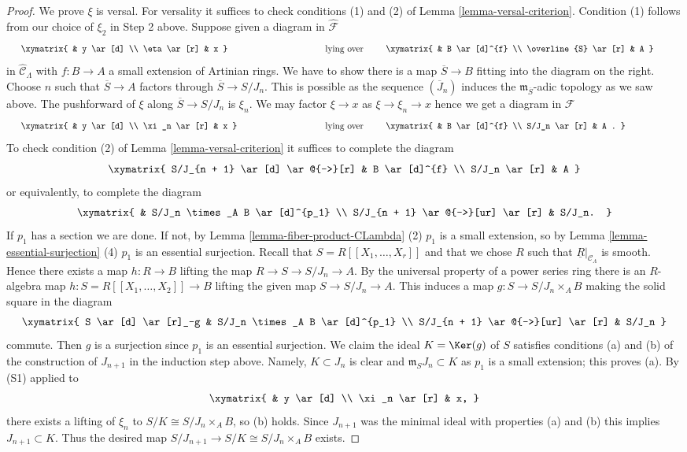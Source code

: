 \begin{proof}
\medskip\noindent
We prove $\xi$ is versal. For versality it suffices to check
conditions (1) and (2) of
Lemma \ref{lemma-versal-criterion}.
Condition (1) follows from our choice of $\xi_2$ in Step 2 above.
Suppose given a diagram in $\widehat{\mathcal{F}}$
$$
\vcenter{
\xymatrix{
            &  y \ar[d] \\
\eta \ar[r]  &  x
}
}
\quad\text{lying over}\quad
\vcenter{
\xymatrix{
         &   B  \ar[d]^{f} \\
\overline{S} \ar[r] &   A
}
}
$$
in $\widehat{\mathcal{C}}_\Lambda$ with $f: B \to A$ a small extension
of Artinian rings. We have to show there is a map $\overline{S} \to B$ fitting
into the diagram on the right. Choose $n$ such that
$\overline{S} \to A$ factors through $\overline{S} \to S/J_n$. This is
possible as the sequence $(\overline{J}_n)$ induces the
$\mathfrak m_{\overline{S}}$-adic topology as we saw above.
The pushforward of $\xi$ along $\overline{S} \to S/J_n$ is $\xi_n$.
We may factor $\xi \to x$ as $\xi \to \xi_n \to x$ hence we get a diagram
in $\mathcal{F}$
$$
\vcenter{
\xymatrix{
            &  y \ar[d] \\
\xi_n \ar[r]  &  x
}
}
\quad\text{lying over}\quad
\vcenter{
\xymatrix{
         &   B  \ar[d]^{f} \\
S/J_n \ar[r] &   A .
}
}
$$
To check condition (2) of
Lemma \ref{lemma-versal-criterion}
it suffices to complete the diagram
$$
\xymatrix{
S/J_{n + 1} \ar[d] \ar@{-->}[r] & B \ar[d]^{f} \\
S/J_n   \ar[r] & A
}
$$
or equivalently, to complete the diagram
$$
\xymatrix{
  &  S/J_n \times_A B \ar[d]^{p_1} \\
S/J_{n + 1} \ar@{-->}[ur] \ar[r] &  S/J_n.
}
$$
If $p_1$ has a section we are done. If not, by
Lemma \ref{lemma-fiber-product-CLambda} (2)
$p_1$ is a small extension, so by
Lemma \ref{lemma-essential-surjection} (4)
$p_1$ is an essential surjection. Recall that $S = R[[X_1, \ldots, X_r]]$
and that we chose $R$ such that $\underline{R}|_{\mathcal{C}_\Lambda}$
is smooth. Hence there exists a map $h : R \to B$ lifting the map
$R \to S \to S/J_n \to A$. By the universal property of a power series
ring there is an $R$-algebra map $h : S = R[[X_1, \ldots, X_2]] \to B$
lifting the given map $S \to S/J_n \to A$. This induces a map
$g: S \to S/J_n \times_A B$ making the solid square in the diagram
$$
\xymatrix{
S \ar[d] \ar[r]_-g  &  S/J_n \times_A B \ar[d]^{p_1} \\
S/J_{n + 1} \ar@{-->}[ur] \ar[r] &  S/J_n
}
$$
commute. Then $g$ is a surjection since $p_1$ is an essential surjection.
We claim the ideal $K = \Ker(g)$ of $S$ satisfies conditions (a) and
(b) of the construction of $J_{n + 1}$ in the induction step above.
Namely, $K \subset J_n$ is clear and $\mathfrak m_SJ_n \subset K$ as $p_1$
is a small extension; this proves (a). By (S1) applied to
$$
\xymatrix{
            &  y \ar[d] \\
\xi_n \ar[r]  &  x,
}
$$
there exists a lifting of $\xi_n$ to $S/K \cong S/J_n \times_A B$, so (b)
holds. Since $J_{n + 1}$ was the minimal ideal with properties (a) and (b)
this implies $J_{n + 1} \subset K$. Thus the desired map
$S/J_{n+1} \to S/K \cong S/J_n \times_A B$ exists.
\end{proof}

